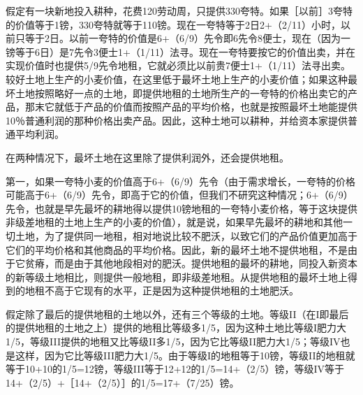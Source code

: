 假定有一块新地投入耕种，花费120劳动周，只提供330夸特。如果［以前］3夸特的价值等于1镑，330夸特就等于110镑。现在一夸特等于2日2+（2/11）小时，以前只等于2日。以前一夸特的价值是6+（6/9）先令即6先令8便士，现在（因为一镑等于6日）是7先令3便士1+（1/11）法寻。现在一夸特要按它的价值出卖，并在实现价值时也提供5/9先令地租，它就必须比以前贵7便士1+（1/11）法寻出卖。较好土地上生产的小麦价值，在这里低于最坏土地上生产的小麦价值；如果这种最坏土地按照略好一点的土地，即提供地租的土地所生产的一夸特的价格出卖它的产品，那末它就低于产品的价值而按照产品的平均价格，也就是按照最坏土地能提供10％普通利润的那种价格出卖产品。因此，这种土地可以耕种，并给资本家提供普通平均利润。

在两种情况下，最坏土地在这里除了提供利润外，还会提供地租。

第一，如果一夸特小麦的价值高于6+（6/9）先令（由于需求增长，一夸特的价格可能高于6+（6/9）先令，即高于它的价值，但我们不研究这种情况；6+（6/9）先令，也就是早先最坏的耕地得以提供10镑地租的一夸特小麦价格，等于这块提供非级差地租的土地上生产的小麦的价值），就是说，如果早先最坏的耕地和其他一切土地，为了提供同一地租，相对地说比较不肥沃，以致它们的产品价值更加高于它们的平均价格和其他商品的平均价格。因此，新的最坏土地不提供地租，不是由于它贫瘠，而是由于其他地段相对的肥沃。提供地租的最坏的耕地，同投入新资本的新等级土地相比，则提供一般地租，即非级差地租。从提供地租的最坏土地上得到的地租不高于它现有的水平，正是因为这种提供地租的土地肥沃。

假定除了最后的提供地租的土地以外，还有三个等级的土地。等级II（在I即最后的提供地租的土地之上）提供的地租比等级多1/5，因为这种土地比等级I肥力大1/5，等级III提供的地租又比等级II多1/5，因为它比等级II肥力大1/5；等级IV也是这样，因为它比等级III肥力大1/5。由于等级I的地租等于10镑，等级II的地租就等于10+10的1/5=12镑，等级III等于12+12的1/5=14+（2/5）镑，等级IV等于14+（2/5）+［14+（2/5）］的1/5=17+（7/25）镑。

